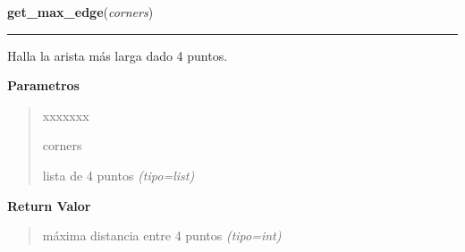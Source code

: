 \hspace{.8\funcindent}\begin{boxedminipage}{\funcwidth}

    \raggedright \textbf{get\_max\_edge}(\textit{corners})

    \vspace{-1.5ex}

    \rule{\textwidth}{0.5\fboxrule}
\setlength{\parskip}{2ex}
Halla la arista más larga dado 4 puntos.

\setlength{\parskip}{1ex}
      \textbf{Parametros}
      \vspace{-1ex}

      \begin{quote}
        \begin{Ventry}{xxxxxxx}

          \item[corners]


lista de 4 puntos
            {\it (tipo=list)}

        \end{Ventry}

      \end{quote}

      \textbf{Return Valor}
    \vspace{-1ex}

      \begin{quote}

máxima distancia entre 4 puntos
      {\it (tipo=int)}

      \end{quote}

    \end{boxedminipage}

    \label{src:functions:get_external_corners}

    \vspace{0.5ex}

